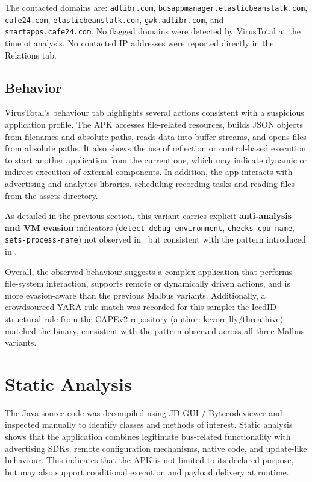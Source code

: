 The contacted domains are: \texttt{adlibr.com}, \texttt{busappmanager.elasticbeanstalk.com}, \texttt{cafe24.com}, \texttt{elasticbeanstalk.com}, \texttt{gwk.adlibr.com}, and \texttt{smartapps.cafe24.com}. No flagged domains were detected by VirusTotal at the time of analysis. No contacted IP addresses were reported directly in the Relations tab.

\subsection{Behavior}
VirusTotal's behaviour tab highlights several actions consistent with a suspicious application profile. The APK accesses file-related resources, builds JSON objects from filenames and absolute paths, reads data into buffer streams, and opens files from absolute paths. It also shows the use of reflection or control-based execution to start another application from the current one, which may indicate dynamic or indirect execution of external components. In addition, the app interacts with advertising and analytics libraries, scheduling recording tasks and reading files from the assets directory.

As detailed in the previous section, this variant carries explicit \textbf{anti-analysis and VM evasion} indicators (\texttt{detect-debug-environment}, \texttt{checks-cpu-name}, \texttt{sets-process-name}) not observed in \oner\ but consistent with the pattern introduced in \twor.

Overall, the observed behaviour suggests a complex application that performs file-system interaction, supports remote or dynamically driven actions, and is more evasion-aware than the previous Malbus variants. Additionally, a crowdsourced YARA rule match was recorded for this sample: the IcedID structural rule from the CAPEv2 repository (author: kevoreilly/threathive) matched the binary, consistent with the pattern observed across all three Malbus variants.



\section{Static Analysis}
The Java source code was decompiled using JD-GUI / Bytecodeviewer and inspected manually to identify classes and methods of interest.
Static analysis shows that the application combines legitimate bus-related functionality with advertising SDKs, remote configuration mechanisms, native code, and update-like behaviour. This indicates that the APK is not limited to its declared purpose, but may also support conditional execution and payload delivery at runtime.


